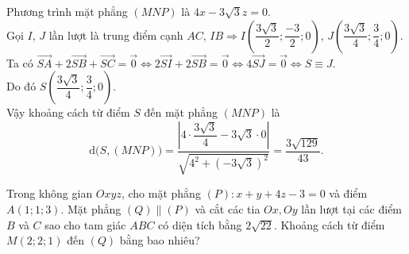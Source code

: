 \begin{bt}
{		Phương trình mặt phẳng $(MNP)$ là  $4x-3\sqrt{3}z=0$.\\
		Gọi $I$, $J$ lần lượt  là trung điểm cạnh $AC$, $IB\Rightarrow I\left(\dfrac{3\sqrt{3}}{2};\dfrac{-3}{2};0\right)$, $J\left(\dfrac{3\sqrt{3}}{4};\dfrac{3}{4};0\right)$.\\
		Ta có $\overrightarrow{SA}+2\overrightarrow{SB}+\overrightarrow{SC}=\overrightarrow{0}\Leftrightarrow  2\overrightarrow{SI}+2\overrightarrow{SB}=\overrightarrow{0}\Leftrightarrow 4\overrightarrow{SJ}=\overrightarrow{0}\Leftrightarrow S\equiv J$.\\
		Do đó  $S\left(\dfrac{3\sqrt{3}}{4};\dfrac{3}{4};0\right)$.\\
		Vậy khoảng cách từ điểm $S$ đến mặt phẳng $(MNP)$ là 
		\[\mathrm{d}\Big(S,(MNP)\Big)=\dfrac{\left|4\cdot \dfrac{3\sqrt 3}{4}-3\sqrt 3\cdot 0\right|}{\sqrt{4^2+\left(-3\sqrt 3\right)^2}}=\dfrac{3\sqrt{129}}{43}.\] 
	} 
\end{bt}

\begin{bt}%
	Trong không gian $Oxyz$, cho mặt phẳng $(P)\colon x+y+4z-3=0$ và điểm $A(1; 1; 3)$. Mặt phẳng $(Q) \parallel(P)$ và cắt các tia $Ox, Oy$ lần lượt tại các điểm $B$ và $C$ sao cho tam giác $ABC$ có diện tích bằng $2\sqrt{22}$. Khoảng cách từ điểm $M(2; 2; 1)$ đến $(Q)$ bằng bao  nhiêu?
\end{bt}

